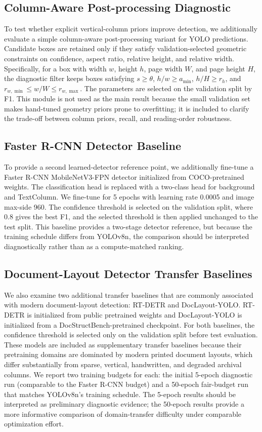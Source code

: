 \documentclass[12pt]{article}
\begin{document}
\subsection{Column-Aware Post-processing Diagnostic}
To test whether explicit vertical-column priors improve detection, we additionally evaluate a simple column-aware post-processing variant for YOLO predictions. Candidate boxes are retained only if they satisfy validation-selected geometric constraints on confidence, aspect ratio, relative height, and relative width. Specifically, for a box with width $w$, height $h$, page width $W$, and page height $H$, the diagnostic filter keeps boxes satisfying $s\geq\theta$, $h/w\geq a_{\min}$, $h/H\geq r_h$, and $r_{w,\min}\leq w/W\leq r_{w,\max}$. The parameters are selected on the validation split by F1. This module is not used as the main result because the small validation set makes hand-tuned geometry priors prone to overfitting; it is included to clarify the trade-off between column priors, recall, and reading-order robustness.

\subsection{Faster R-CNN Detector Baseline}
To provide a second learned-detector reference point, we additionally fine-tune a Faster R-CNN MobileNetV3-FPN detector initialized from COCO-pretrained weights. The classification head is replaced with a two-class head for background and TextColumn. We fine-tune for 5 epochs with learning rate 0.0005 and image max-side 960. The confidence threshold is selected on the validation split, where 0.8 gives the best F1, and the selected threshold is then applied unchanged to the test split. This baseline provides a two-stage detector reference, but because the training schedule differs from YOLOv8n, the comparison should be interpreted diagnostically rather than as a compute-matched ranking.

\subsection{Document-Layout Detector Transfer Baselines}
We also examine two additional transfer baselines that are commonly associated with modern document-layout detection: RT-DETR and DocLayout-YOLO. RT-DETR is initialized from public pretrained weights and DocLayout-YOLO is initialized from a DocStructBench-pretrained checkpoint. For both baselines, the confidence threshold is selected only on the validation split before test evaluation. These models are included as supplementary transfer baselines because their pretraining domains are dominated by modern printed document layouts, which differ substantially from sparse, vertical, handwritten, and degraded archival columns. We report two training budgets for each: the initial 5-epoch diagnostic run (comparable to the Faster R-CNN budget) and a 50-epoch fair-budget run that matches YOLOv8n's training schedule. The 5-epoch results should be interpreted as preliminary diagnostic evidence; the 50-epoch results provide a more informative comparison of domain-transfer difficulty under comparable optimization effort.
\end{document}
